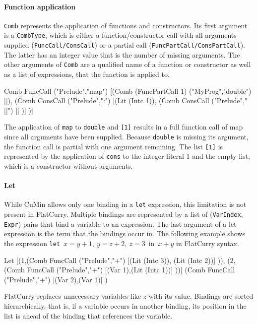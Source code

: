 \documentclass[paper = a4, fleqn, abstract=on, twoside]{scrreprt}
\newcommand{\coqinline}[1]{\texttt{#1}}
\begin{document}
\paragraph{Function application}
\coqinline{Comb} represents the application of functions and constructors. Its first argument is a \coqinline{CombType}, which is either a function/constructor call with all arguments supplied (\coqinline{FuncCall/ConsCall}) or a partial call (\coqinline{FuncPartCall/ConsPartCall}). The latter has an integer value that is the number of missing arguments. The other arguments of \coqinline{Comb} are a qualified name of a function or constructor as well as a list of expressions, that the function is applied to.
\begin{coqcode}
Comb FuncCall ("Prelude","map") 
     [(Comb (FuncPartCall 1) ("MyProg","double") []),
      (Comb ConsCall ("Prelude",":") [(Lit (Intc 1)),
                                      (Comb ConsCall ("Prelude","[]") [] )] )]
\end{coqcode}
The application of \texttt{map} to \texttt{double} and \texttt{[1]} results in a full function call of map since all arguments have been supplied. Because \texttt{double} is missing its argument, the function call is partial with one argument remaining. The list \texttt{[1]} is represented by the application of \texttt{cons} to the integer literal 1 and the empty list, which is a constructor without arguments.
\paragraph{Let}
While CuMin allows only one binding in a \texttt{let} expression, this limitation is not present in FlatCurry. Multiple bindings are represented by a list of (\coqinline{VarIndex}, \coqinline{Expr}) pairs that bind a variable to an expression. The last argument of a let expression is the term that the bindings occur in. The following example shows the expression \mbox{\texttt{let} $x = y + 1,\: y = z + 2,\: z = 3$ in $x + y$} in FlatCurry syntax.
\begin{coqcode}
Let [(1,(Comb FuncCall ("Prelude","+") [(Lit (Intc 3)), (Lit (Intc 2))] )),
     (2,(Comb FuncCall ("Prelude","+") [(Var 1),(Lit (Intc 1))] ))]
    (Comb FuncCall ("Prelude","+") [(Var 2),(Var 1)] )
\end{coqcode}
FlatCurry replaces unnecessary variables like $z$ with its value. Bindings are sorted hierarchically, that is, if a variable occurs in another binding, its position in the list is ahead of the binding that references the variable.
\end{document}
